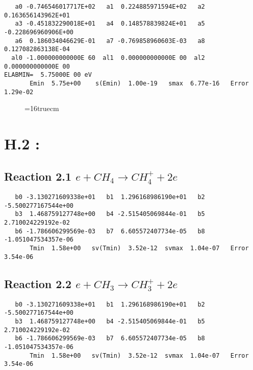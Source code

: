 \documentclass[12pt]{article}
\begin{document}
\begin{small}\begin{verbatim} 
   a0 -0.746546017717E+02   a1  0.224885971594E+02   a2  0.163656143962E+01
   a3 -0.451832290018E+01   a4  0.148578839824E+01   a5 -0.228696960906E+00
   a6  0.186034046629E-01   a7 -0.769858960603E-03   a8  0.127082863138E-04
  al0 -1.000000000000E 60  al1  0.000000000000E 00  al2  0.000000000000E 00
ELABMIN=  5.75000E 00 eV
       Emin  5.75e+00    s(Emin)  1.00e-19   smax  6.77e-16   Error  1.29e-02
\end{verbatim}\end{small} 
 
\begin{figure} \label{met.1_3.2}
\epsfxsize=16truecm
\end{figure}
\newpage
 
 
 
\section{H.2 :}



\subsection{ 
Reaction 2.1       $e + CH_4 \rightarrow CH_4^+ + 2e$
}

\begin{small}\begin{verbatim} 
   b0 -3.130271609338e+01   b1  1.296168986190e+01   b2 -5.500277167544e+00
   b3  1.468759127748e+00   b4 -2.515405069844e-01   b5  2.710024229192e-02
   b6 -1.786606299569e-03   b7  6.605572407734e-05   b8 -1.051047534357e-06
       Tmin  1.58e+00   sv(Tmin)  3.52e-12  svmax  1.04e-07   Error  3.54e-06
\end{verbatim}\end{small}
 
\subsection{
Reaction 2.2       $e + CH_3 \rightarrow CH_3^+ + 2e$
}

\begin{small}\begin{verbatim} 
   b0 -3.130271609338e+01   b1  1.296168986190e+01   b2 -5.500277167544e+00
   b3  1.468759127748e+00   b4 -2.515405069844e-01   b5  2.710024229192e-02
   b6 -1.786606299569e-03   b7  6.605572407734e-05   b8 -1.051047534357e-06
       Tmin  1.58e+00   sv(Tmin)  3.52e-12  svmax  1.04e-07   Error  3.54e-06
\end{verbatim}\end{small}
\end{document}
